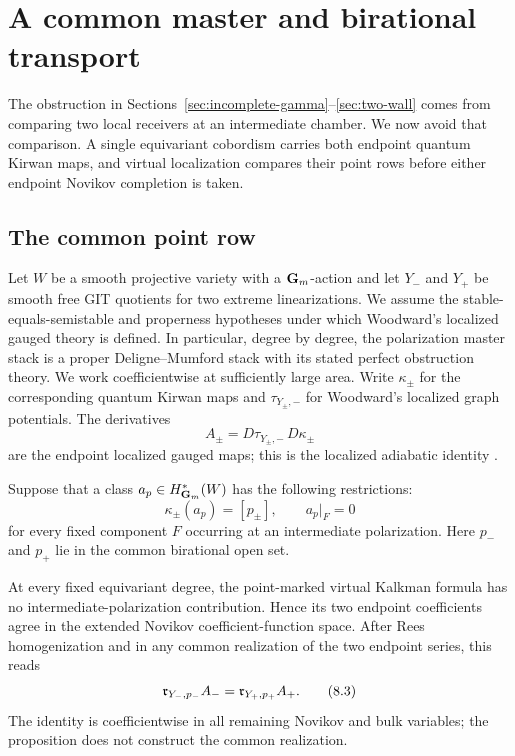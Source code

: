 \section{A common master and birational transport}
\label{sec:global-transport}

The obstruction in Sections~\ref{sec:incomplete-gamma}--\ref{sec:two-wall}
comes from comparing two local receivers at an intermediate chamber.  We now
avoid that comparison.  A single equivariant cobordism carries both endpoint
quantum Kirwan maps, and virtual localization compares their point rows before
either endpoint Novikov completion is taken.

\subsection{The common point row}

Let \(W\) be a smooth projective variety with a \(\mathbf G_m\)-action and let
\(Y_-\) and \(Y_+\) be smooth free GIT quotients for two extreme
linearizations.  We assume the stable-equals-semistable and properness
hypotheses under which Woodward's localized gauged theory is defined.  In
particular, degree by degree, the polarization master stack is a proper
Deligne--Mumford stack with its stated perfect obstruction theory.  We work
coefficientwise at sufficiently large area.  Write \(\kappa_\pm\) for
the corresponding quantum Kirwan maps and \(\tau_{Y_\pm,-}\) for Woodward's
localized graph potentials.  The
derivatives
\[
 A_\pm=D\tau_{Y_\pm,-}\,D\kappa_\pm                       \tag{8.1}
\]
are the endpoint localized gauged maps; this is the localized adiabatic
identity \cite[Equation~(68)]{WoodwardQKIII}.

Suppose that a class \(a_p\in H^*_{\mathbf G_m}(W)\) has the following restrictions:
\[
 \kappa_\pm(a_p)=[p_\pm],\qquad
 a_p|_F=0                                                     \tag{8.2}
\]
for every fixed component \(F\) occurring at an intermediate polarization.
Here \(p_-\) and \(p_+\) lie in the common birational open set.

\begin{proposition}
\label{prop:support-collapse}
At every fixed equivariant degree, the point-marked virtual Kalkman formula
has no intermediate-polarization contribution.  Hence its two endpoint
coefficients agree in the extended Novikov coefficient-function space.
After Rees homogenization and in any common realization of the two endpoint
series, this reads
\[
 \mathfrak r_{Y_-,p_-}A_- =\mathfrak r_{Y_+,p_+}A_+.                    \tag{8.3}
\]
The identity is coefficientwise in all remaining Novikov and bulk
variables; the proposition does not construct the common realization.
\end{proposition}

